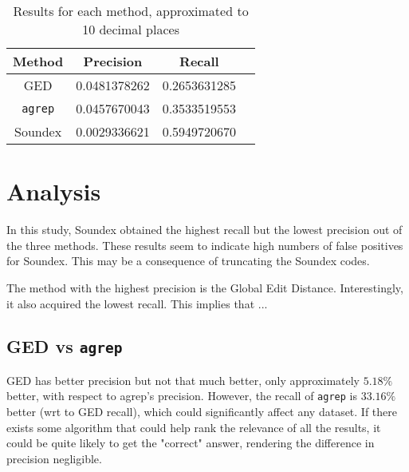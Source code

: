 \documentclass[11pt]{article}
\begin{document}
\begin{table}[h]
 \begin{center}
\begin{tabular}{|c||c|c|c|}

\hline
Method & Precision & Recall \\
\hline\hline
GED & 0.0481378262 & 0.2653631285 \\ 
\texttt{agrep} & 0.0457670043 & 0.3533519553 \\ 
Soundex & 0.0029336621 & 0.5949720670 \\
\hline

\end{tabular}
\caption{Results for each method, approximated to 10 decimal places}\label{results}
 \end{center}
\end{table}

\section{Analysis}

In this study, Soundex obtained the highest recall but the lowest precision out of the three methods. These results seem to indicate high numbers of false positives for Soundex. This may be a consequence of truncating the Soundex codes. %

The method with the highest precision is the Global Edit Distance. Interestingly, it also acquired the lowest recall. This implies that ... %

\subsection{GED vs \texttt{agrep}}
GED has better precision but not that much better, only approximately \(5.18\%\) better, with respect to agrep's precision. However, the recall of \texttt{agrep} is \(33.16\%\) better (wrt to GED recall), which could significantly affect any dataset. If there exists some algorithm that could help rank the relevance of all the results, it could be quite likely to get the "correct" answer, rendering the difference in precision negligible. %
 

 
\end{document}
